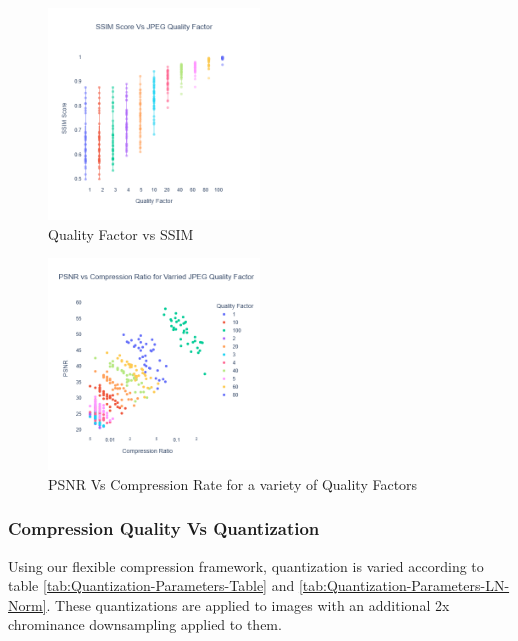 \begin{figure}
    \includegraphics[width=0.5\textwidth]{assets/JPEG Quality factor and SSIM Score.png}
    \caption{Quality Factor vs SSIM}
    \label{fig:ssim_jpeg}
\end{figure}

\begin{figure}
    \includegraphics[width=0.5\textwidth]{assets/JPEG Compression Ratio Vs PSNR.png}
    \caption{PSNR Vs Compression Rate for a variety of Quality Factors}
    \label{fig:psnr_vs_compression_ratio}
\end{figure}

\subsubsection{Compression Quality Vs Quantization}

Using our flexible compression framework, quantization is varied according to table \ref{tab:Quantization-Parameters-Table} and \ref{tab:Quantization-Parameters-LN-Norm}. These quantizations are applied to images with an additional 2x chrominance downsampling applied to them.

